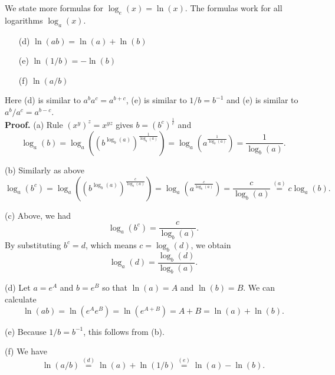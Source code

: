 \documentclass[12pt]{article}
\begin{document}
We state more formulas for \(\log_e(x)=\ln(x)\). The formulas work for all logarithms \(\log_a(x)\).\\[2mm]

\begin{enumerate}
\item [(d)] $\ln(ab)=\ln(a)+\ln(b)$
\item [(e)] $\ln(1/b)=-\ln(b)$
\item [(f)] $\ln(a/b)$
\end{enumerate}

Here (d) is similar to $a^ba^c=a^{b+c}$, (e) is similar to $1/b=b^{-1}$ and (e) is similar to $a^b/a^c=a^{b-c}$.\\[2mm]

\noindent\textbf{Proof.} (a) Rule \((x^y)^z=x^{yz}\) gives \(b=(b^c)^{\frac{1}{c}}\) and
$$
\log_a(b)=\log_a\left(\left(b^{\log_b(a)}\right)^{\frac{1}{\log_b(a)}}\right)
=\log_a\left(a^{\frac{1}{\log_b(a)}}\right)=\frac{1}{\log_b(a)}.
$$

(b) Similarly as above
$$
\log_a(b^c)=\log_a\left(\left(b^{\log_b(a)}\right)^{\frac{c}{\log_b(a)}}\right)
=\log_a\left(a^{\frac{c}{\log_b(a)}}\right)=\frac{c}{\log_b(a)}\stackrel{(a)}{=}c\log_a(b).
$$

(c) Above, we had
$$
\log_a(b^c)=\frac{c}{\log_b(a)}.
$$
By substituting $b^c=d$, which means $c=\log_b(d)$, we obtain
$$
\log_a(d)=\frac{\log_b(d)}{\log_b(a)}.
$$

(d) Let \(a=e^A\) and \(b=e^B\) so that \(\ln(a)=A\) and \(\ln(b)=B\). We can calculate
$$
\ln(ab)=\ln(e^Ae^B)=\ln(e^{A+B})=A+B=\ln(a)+\ln(b).
$$

(e) Because $1/b=b^{-1}$, this follows from (b).

(f) We have
$$
\ln(a/b)\stackrel{(d)}{=}\ln(a)+\ln(1/b)\stackrel{(e)}{=}\ln(a)-\ln(b).
$$
\end{document}
